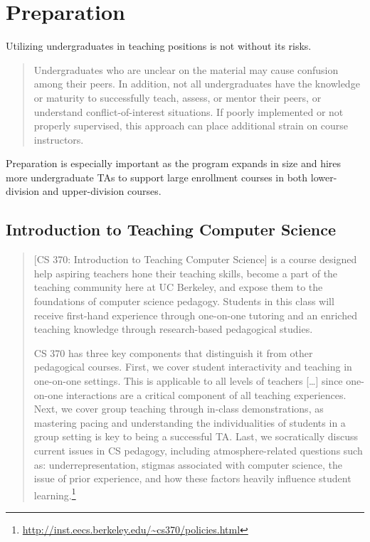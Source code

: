 \chapter{Preparation}
\label{chapter:preparation}

Utilizing undergraduates in teaching positions is not without its risks.
\begin{quote}
    Undergraduates who are unclear on the material may cause confusion among their peers. In addition, not all undergraduates have the knowledge or maturity to successfully teach, assess, or mentor their peers, or understand conflict-of-interest situations. If poorly implemented or not properly supervised, this approach can place additional strain on course instructors. \cite{CSUndergraduateEnrollments}
\end{quote}
Preparation is especially important as the program expands in size and hires more undergraduate TAs to support large enrollment courses in both lower-division and upper-division courses.

\section{Introduction to Teaching Computer Science}
\label{section:cs370}

\begin{quotation}
    [CS 370: Introduction to Teaching Computer Science] is a course designed help aspiring teachers hone their teaching skills, become a part of the teaching community here at UC Berkeley, and expose them to the foundations of computer science pedagogy. Students in this class will receive first-hand experience through one-on-one tutoring and an enriched teaching knowledge through research-based pedagogical studies.

    CS 370 has three key components that distinguish it from other pedagogical courses. First, we cover student interactivity and teaching in one-on-one settings. This is applicable to all levels of teachers [\dots\unkern] since one-on-one interactions are a critical component of all teaching experiences. Next, we cover group teaching through in-class demonstrations, as mastering pacing and understanding the individualities of students in a group setting is key to being a successful TA. Last, we socratically discuss current issues in CS pedagogy, including atmosphere-related questions such as: underrepresentation, stigmas associated with computer science, the issue of prior experience, and how these factors heavily influence student learning.\footnote{\url{http://inst.eecs.berkeley.edu/~cs370/policies.html}}
\end{quotation}

